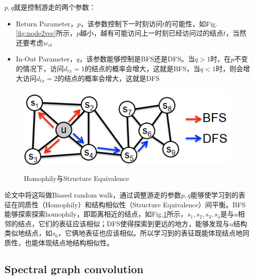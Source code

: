 $p, q$就是控制游走的两个参数：
\begin{itemize}
	\item Return Parameter，$p$，该参数控制下一时刻访问$t$的可能性，如Fig.\ref{fig:node2vec}所示，$p$越小，越有可能访问上一时刻已经访问过的结点$t$，当然还要考虑$w_{vt}$
	\item In-Out Parameter，$q$，该参数能够控制是BFS还是DFS。当$q>1$时，在$p$不变的情况下，访问$d_{tx} = 1$的结点的概率会增大，这就是BFS，当$q<1$时，则会增大访问$d_{tx} = 2$的结点的概率会增大，这就是DFS
\end{itemize}
\begin{figure}[h]
	\centering
	\includegraphics[width=.8\textwidth]{pics/node2vec2.png}
	\label{fig:node2vec2}
	\caption{Homophily与Structure Equivalence}
\end{figure}

论文中将这叫做Biased random walk，通过调整游走的参数$p,q$能够使学习到的表征在同质性（Homophily）和结构相似性（Structure Equivalence）间平衡。BFS能够探索探索homophily，即距离相近的结点，如Fig.\ref{fig:node2vec2}所示，$s_1, s_2, s_3, s_4$是与$u$相邻的结点，它们的表征应该相似；DFS使得探索到更远的地方，能够发现与$u$结构类似地结点，如$s_6$，它俩地表征也应该相似。所以学习到的表征既能体现结点地同质性，也能体现结点地结构相似性。

\subsection{Spectral graph convolution}